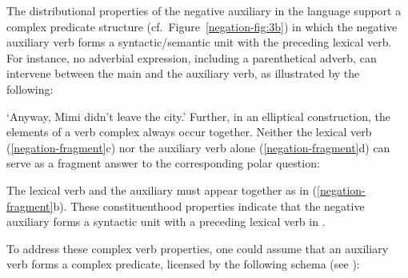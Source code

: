 \documentclass[output=paper,biblatex,babelshorthands,newtxmath,draftmode,colorlinks,citecolor=brown]{langscibook}
\begin{document}
\begin{exe}
\begin{xlist}
\begin{exe}
\begin{xlist}
The distributional properties of the negative auxiliary in the language support
 a complex predicate structure (cf.\ Figure~\ref{negation-fig:3b}) in which the negative auxiliary verb
forms a syntactic/semantic unit with the preceding lexical verb.
For instance, no adverbial expression, including
a parenthetical adverb, can intervene between
the main and the auxiliary verb, as illustrated by the
following:

\ea
{}
\glt `Anyway, Mimi didn't leave the city.'
\z
%
Further, in an elliptical construction, the elements of a verb complex
 always occur together. Neither the lexical  verb (\ref{negation-fragment}c) nor the
 auxiliary verb alone (\ref{negation-fragment}d) can serve
as a fragment answer to the corresponding polar question:

\eal
\label{negation-fragment}
\zl

\noindent
The lexical verb and the auxiliary must appear together as in (\ref{negation-fragment}b). These
constituenthood properties indicate that the negative auxiliary forms a syntactic unit with a
preceding lexical  verb in . 

To address these complex verb properties, one could assume that
an auxiliary verb forms a complex predicate, licensed by
the following schema (see \citealt[95]{Kim:16}):


\end{xlist}
\end{exe}
\end{xlist}
\end{exe}
\end{document}
